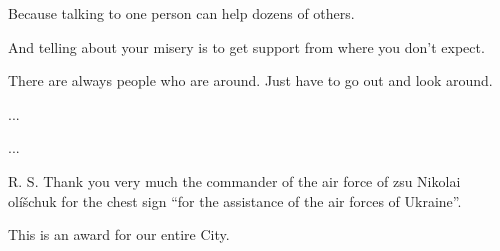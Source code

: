 Because talking to one person can help dozens of others.\par
And telling about your misery is to get support from where you don't expect.\par
There are always people who are around. Just have to go out and look around.\par
...\par
...\par
R. S. Thank you very much the commander of the air force of zsu Nikolai olíšchuk for the chest sign \enquote{for the assistance of the air forces of Ukraine}.\par
This is an award for our entire City.\par
